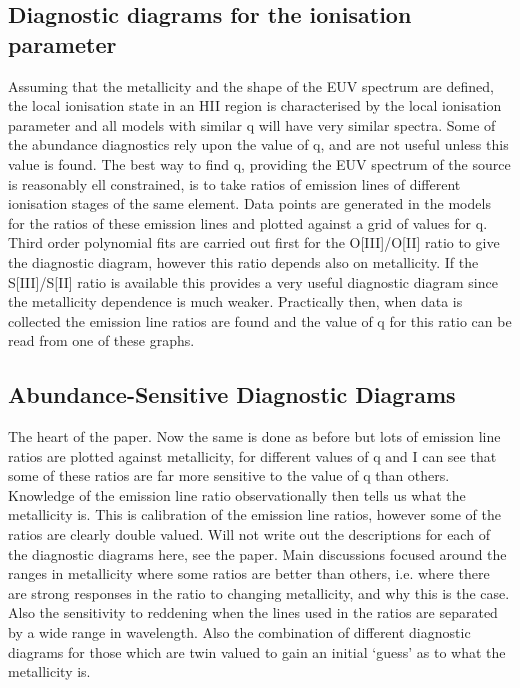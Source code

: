 \documentclass{literature}
\begin{document}
\subsection{Diagnostic diagrams for the ionisation parameter}
Assuming that the metallicity and the shape of the EUV spectrum are defined, the local ionisation state in an HII region is characterised by the local ionisation parameter and all models with similar q will have very similar spectra. Some of the abundance diagnostics rely upon the value of q, and are not useful unless this value is found. The best way to find q, providing the EUV spectrum of the source is reasonably ell constrained, is to take ratios of emission lines of different ionisation stages of the same element. Data points are generated in the models for the ratios of these emission lines and plotted against a grid of values for q. Third order polynomial fits are carried out first for the O[III]/O[II] ratio to give the diagnostic diagram, however this ratio depends also on metallicity. If the S[III]/S[II] ratio is available this provides a very useful diagnostic diagram since the metallicity dependence is much weaker. Practically then, when data is collected the emission line ratios are found and the value of q for this ratio can be read from one of these graphs.

\subsection{Abundance-Sensitive Diagnostic Diagrams}
The heart of the paper. Now the same is done as before but lots of emission line ratios are plotted against metallicity, for different values of q and I can see that some of these ratios are far more sensitive to the value of q than others. Knowledge of the emission line ratio observationally then tells us what the metallicity is. This is calibration of the emission line ratios, however some of the ratios are clearly double valued. Will not write out the descriptions for each of the diagnostic diagrams here, see the paper. 
Main discussions focused around the ranges in metallicity where some ratios are better than others, i.e. where there are strong responses in the ratio to changing metallicity, and why this is the case. Also the sensitivity to reddening when the lines used in the ratios are separated by a wide range in wavelength. Also the combination of different diagnostic diagrams for those which are twin valued to gain an initial `guess' as to what the metallicity is.
\end{document}

